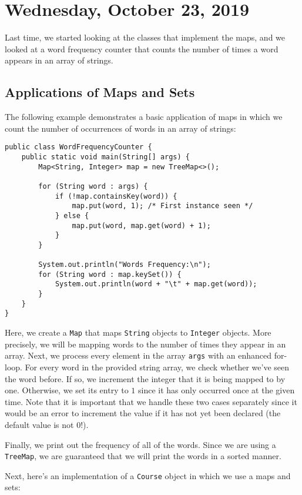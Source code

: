 \section{Wednesday, October 23, 2019}

Last time, we started looking at the classes that implement the maps, and we looked at a word frequency counter that counts the number of times a word appears in an array of strings.

\subsection{Applications of Maps and Sets}

The following example demonstrates a basic application of maps in which we count the number of occurrences of words in an array of strings:

\begin{lstlisting}
public class WordFrequencyCounter {
	public static void main(String[] args) {
		Map<String, Integer> map = new TreeMap<>();
		
		for (String word : args) {
			if (!map.containsKey(word)) {
				map.put(word, 1); /* First instance seen */
			} else {
				map.put(word, map.get(word) + 1);
			}
		}
		
		System.out.println("Words Frequency:\n");
		for (String word : map.keySet()) {
			System.out.println(word + "\t" + map.get(word));
		}
	}
}
\end{lstlisting}

Here, we create a \verb!Map! that maps \verb!String! objects to \verb!Integer! objects. More precisely, we will be mapping words to the number of times they appear in an array. Next, we process every element in the array \verb!args! with an enhanced for-loop. For every word in the provided string array, we check whether we've seen the word before. If so, we increment the integer that it is being mapped to by one. Otherwise, we set its entry to $1$ since it has only occurred once at the given time. Note that it is important that we handle these two cases separately since it would be an error to increment the value if it has not yet been declared (the default value is not $0$!).  

Finally, we print out the frequency of all of the words. Since we are using a \verb!TreeMap!, we are guaranteed that we will print the words in a sorted manner. 


Next, here's an implementation of a \verb!Course! object in which we use a maps and sets:

